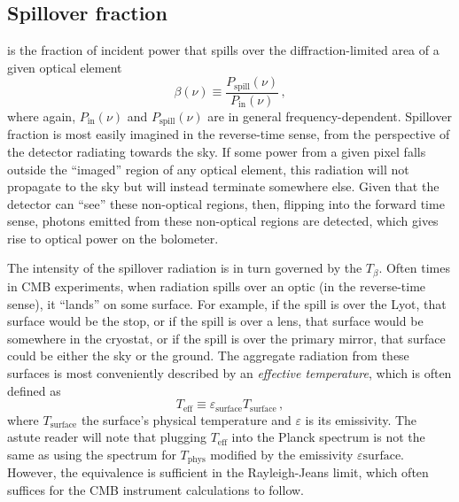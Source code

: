 
\subsection{Spillover fraction}
\label{sec:sensitivity_spillover_fraction}

 is the fraction of incident power that spills over the diffraction-limited area of a given optical element
\begin{equation}
    \beta(\nu) \equiv \frac{P_{\mathrm{spill}}(\nu)}{P_{\mathrm{in}}(\nu)} \, ,
    \label{eq:spillover_fraction_definition}
\end{equation}
where again, $P_{\mathrm{in}}(\nu)$ and $P_{\mathrm{spill}}(\nu)$ are in general frequency-dependent. Spillover fraction is most easily imagined in the reverse-time sense, from the perspective of the detector radiating towards the sky. If some power from a given pixel falls outside the ``imaged'' region of any optical element, this radiation will not propagate to the sky but will instead terminate somewhere else. Given that the detector can ``see'' these non-optical regions, then, flipping into the forward time sense, photons emitted from these non-optical regions are detected, which gives rise to optical power on the bolometer. 

The intensity of the spillover radiation is in turn governed by the  $T_{\beta}$. Often times in CMB experiments, when radiation spills over an optic (in the reverse-time sense), it ``lands'' on some surface. For example, if the spill is over the Lyot, that surface would be the stop, or if the spill is over a lens, that surface would be somewhere in the cryostat, or if the spill is over the primary mirror, that surface could be either the sky or the ground. The aggregate radiation from these surfaces is most conveniently described by an \textit{effective temperature}, which is often defined as
\begin{equation}
    T_{\mathrm{eff}} \equiv \varepsilon_{\mathrm{surface}} T_{\mathrm{surface}} \, ,
    \label{eq:effective temperature}
\end{equation}
where $T_{\mathrm{surface}}$ the surface's physical temperature and $\varepsilon$ is its emissivity. The astute reader will note that plugging $T_{\mathrm{eff}}$ into the Planck spectrum is not the same as using the spectrum for $T_{\mathrm{phys}}$ modified by the emissivity $\varepsilon{\mathrm{surface}}$. However, the equivalence is sufficient in the Rayleigh-Jeans limit, which often suffices for the CMB instrument calculations to follow.

